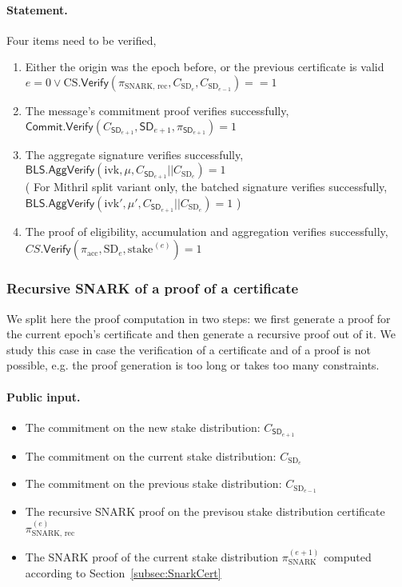 \documentclass{article}
\newcommand{\acc}{\ensuremath{\textrm{acc}}\xspace}
\newcommand{\stake}[1]{\ensuremath{\textrm{stake}_{#1}}\xspace}
\newcommand{\ivk}{\ensuremath{\textrm{ivk}}\xspace}
\newcommand{\BLS}{\ensuremath{\mathsf{BLS}}\xspace}
\newcommand{\Verify}{\ensuremath{\mathsf{Verify}}\xspace}
\newcommand{\AggVerify}{\ensuremath{\mathsf{AggVerify}}\xspace}
\newcommand{\Commit}{\ensuremath{\mathsf{Commit}}\xspace}
\begin{document}
\paragraph{Statement.}

Four items need to be verified,
\begin{enumerate}
    \item Either the origin was the epoch before, or the previous certificate is valid $e = 0 \lor \text{CS}.\Verify(\pi_\text{SNARK, rec}, C_{\text{SD}_e}, C_{\text{SD}_{e-1}}) == 1$
    \item The message's commitment proof verifies successfully,\\ $\Commit.\Verify(C_{\textsf{SD}_{e+1}}, \textsf{SD}_{e+1}, \pi_{\textsf{SD}_{e+1}}) = 1$
    \item The aggregate signature verifies successfully,\\ $\BLS.\AggVerify(\ivk, \mu, C_{\textsf{SD}_{e+1}} || C_{\text{SD}_e}) = 1$\\
    ( For Mithril split variant only, the batched signature verifies successfully,\\ $\BLS.\AggVerify(\ivk', \mu', C_{\textsf{SD}_{e+1}} || C_{\text{SD}_e}) = 1$ )
    \item The proof of eligibility, accumulation and aggregation verifies successfully,\\ $CS.\Verify(\pi_{\acc}, \text{SD}_e, \stake{}^{(e)}) = 1 $
\end{enumerate}

%
\subsubsection{Recursive SNARK of a proof of a certificate}\label{subsub:RecSnarkProof}
We split here the proof computation in two steps: we first generate a proof for the current epoch's certificate and then generate a recursive proof out of it. We study this case in case the verification of a certificate and of a proof is not possible, e.g. the proof generation is too long or takes too many constraints.


\paragraph{Public input.}
\begin{itemize}
    \item The commitment on the new stake distribution: $C_{\textsf{SD}_{e+1}}$
    \item The commitment on the current stake distribution: $C_{\text{SD}_e}$
    \item The commitment on the previous stake distribution: $C_{\text{SD}_{e-1}}$
    \item The recursive SNARK proof on the previsou stake distribution certificate $\pi_\text{SNARK, rec}^{(e)}$
    \item The SNARK proof of the current stake distribution $\pi_\text{SNARK}^{(e+1)}$ computed according to Section~\ref{subsec:SnarkCert}
\end{itemize}
\end{document}
